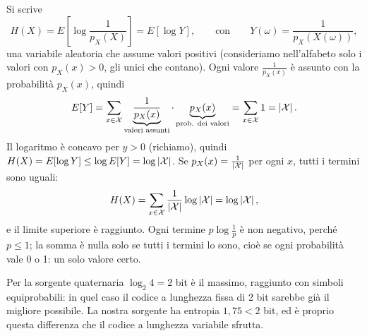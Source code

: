 \begin{dimostrazione}
 Si scrive
\[ H(X) = E\left[ \log \frac{1}{p_X(X)} \right] = E[\log Y] , \qquad\text{con}\qquad Y(\omega) =
   \frac{1}{p_X(X(\omega))} , \]
una variabile aleatoria che assume valori positivi (consideriamo nell'alfabeto solo i valori con $p_X(x) > 0$, gli unici
che contano).
 Ogni valore $\frac{1}{p_X(x)}$ è assunto con la probabilità $p_X(x)$, quindi
\[ E[Y] = \sum_{x \in \mathcal{X}} \underbrace{\frac{1}{p_X(x)}}_{\text{valori assunti}} \cdot
   \underbrace{p_X(x)}_{\text{prob. dei valori}} = \sum_{x \in \mathcal{X}} 1 = \left\lvert \mathcal{X} \right\rvert . \]
 Il logaritmo è concavo per $y > 0$ (richiamo), quindi
$H(X) = E[\log Y] \leq \log E[Y] = \log \left\lvert \mathcal{X} \right\rvert$.
 Se $p_X(x) = \frac{1}{\left\lvert \mathcal{X} \right\rvert}$ per ogni $x$, tutti i termini sono uguali:
\[ H(X) = \sum_{x \in \mathcal{X}} \frac{1}{\left\lvert \mathcal{X} \right\rvert} \log \left\lvert \mathcal{X} \right\rvert = \log \left\lvert \mathcal{X} \right\rvert , \]
e il limite superiore è raggiunto.
 Ogni termine $p \log \frac1p$ è non negativo, perché $p \leq 1$; la somma è nulla solo se
tutti i termini lo sono, cioè se ogni probabilità vale 0 o 1: un solo valore certo.
\end{dimostrazione}

Per la sorgente quaternaria $\log_2 4 = 2$ bit è il massimo, raggiunto con simboli equiprobabili: in quel caso il codice
a lunghezza fissa di 2 bit sarebbe già il migliore possibile. La nostra sorgente ha entropia $1{,}75 < 2$ bit, ed è
proprio questa differenza che il codice a lunghezza variabile sfrutta.

